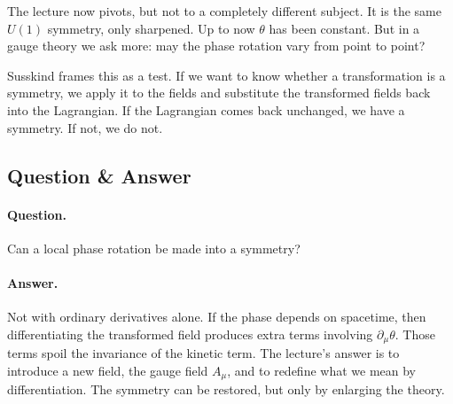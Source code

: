 The lecture now pivots, but not to a completely different subject. It is the same \(U(1)\) symmetry, only sharpened. Up to now \(\theta\) has been constant. But in a gauge theory we ask more: may the phase rotation vary from point to point?

Susskind frames this as a test. If we want to know whether a transformation is a symmetry, we apply it to the fields and substitute the transformed fields back into the Lagrangian. If the Lagrangian comes back unchanged, we have a symmetry. If not, we do not.

\subsection{Question \& Answer}

\paragraph{Question.} Can a local phase rotation be made into a symmetry?

\paragraph{Answer.} Not with ordinary derivatives alone. If the phase depends on spacetime, then differentiating the transformed field produces extra terms involving \(\partial_\mu\theta\). Those terms spoil the invariance of the kinetic term. The lecture's answer is to introduce a new field, the gauge field \(A_\mu\), and to redefine what we mean by differentiation. The symmetry can be restored, but only by enlarging the theory.

